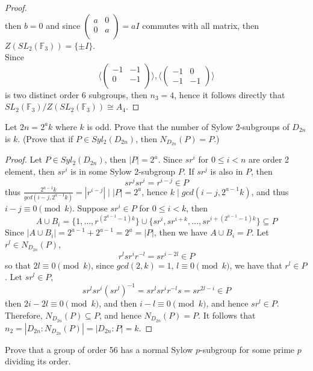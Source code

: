 \documentclass{article}
\newcommand{\F}{\mathbb{F}}
\newenvironment{problem}[2][Problem]{\begin{trivlist}
\item[\hskip \labelsep {\bfseries #1}\hskip \labelsep {\bfseries #2.}]}{\end{trivlist}}
\begin{document}
\begin{proof}
\[    \]
    then $b=0$ and since $\begin{pmatrix}
        a & 0 \\
        0 & a\\
    \end{pmatrix}=aI$ commutes with all matrix, then $Z(SL_2(\F_3))=\{\pm I\}$.\\
    Since 
    \[
    \bigg\langle\begin{pmatrix}
        -1 & -1 \\
        0 & -1 \\
    \end{pmatrix}\bigg\rangle, \bigg\langle\begin{pmatrix}
        -1 & 0\\
        -1 & -1
    \end{pmatrix}\bigg\rangle
    \]
    is two distinct order 6 subgroups, then $n_3 =4$, hence it follows directly that $SL_2(\F_3)/Z(SL_2(\F_3))\cong A_4$.
\end{proof}
\begin{problem}{12}
    Let $2n = 2^a k$ where $k$ is odd. Prove that the number of Sylow 2-subgroups of $D_{2n}$ is $k$.  
    (Prove that if $P \in Syl_2(D_{2n})$, then $N_{D_{2n}}(P) = P$.)
\end{problem}
\begin{proof}
    Let $P\in Syl_2(D_{2n})$, then $|P|=2^a$. Since $sr^i$ for $0\leq i<n$ are order 2 element, then $sr^i$ is in some Sylow 2-subgroup $P$. If $sr^j$ is also in $P$, then 
    \[
        sr^jsr^i=r^{i-j}\in P
    \]
    thus $\frac{2^{a-1}k}{gcd(i-j, 2^{a-1}k)}=|r^{i-j}|\mid |P|=2^a$, hence $k \mid gcd(i-j, 2^{a-1}k)$, and thus $i-j \equiv 0 \pmod k$.
    Suppose $sr^i\in P$ for $0\leq i<k$, then 
    \[
        A\cup B_i=\{1, \dots , r^{(2^{a-1}-1)k}\}\cup \{sr^i, sr^{i+k}, \dots, sr^{i+(2^{a-1}-1)k}\}\subseteq P
    \]
    Since $|A\cup B_i|=2^{a-1}+2^{a-1}=2^a=|P|$, then we have $A\cup B_i=P$. Let $r^l \in N_{D_{2n}}(P)$, 
    \[
        r^lsr^ir^{-l}=sr^{i-2l}\in P
    \]
    so that $2l\equiv 0 \pmod k$, since $gcd(2, k)=1$, $l\equiv 0 \pmod k$, we have that $r^l\in P$. Let $sr^l\in P$, 
    \[
        sr^lsr^i(sr^l)^{-1}=sr^lsr^ir^{-l}s= sr^{2l-i}\in P
    \]
    then $2i-2l\equiv 0 \pmod k$, and then $i-l \equiv 0 \pmod k$, and hence $sr^l \in P$. Therefore, $N_{D_{2n}}(P)\subseteq P$, and hence $N_{D_{2n}}(P)=P$. It follows that $n_2 =|D_{2n}:N_{D_{2n}}(P)|=|D_{2n}:P|=k$.
\end{proof}
\begin{problem}{13}
    Prove that a group of order 56 has a normal Sylow $p$-subgroup for some prime $p$ dividing its order.
\end{problem}
\end{document}
